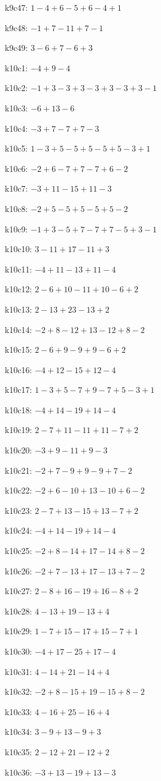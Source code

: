 k9c47: $ 1-4+6-5+6-4+1 $ 

k9c48: $ -1+7-11+7-1 $ 

k9c49: $ 3-6+7-6+3 $ 

k10c1: $ -4+9-4 $ 

k10c2: $ -1+3-3+3-3+3-3+3-1 $ 

k10c3: $ -6+13-6 $ 

k10c4: $ -3+7-7+7-3 $ 

k10c5: $ 1-3+5-5+5-5+5-3+1 $ 

k10c6: $ -2+6-7+7-7+6-2 $ 

k10c7: $ -3+11-15+11-3 $ 

k10c8: $ -2+5-5+5-5+5-2 $ 

k10c9: $ -1+3-5+7-7+7-5+3-1 $ 

k10c10: $ 3-11+17-11+3 $ 

k10c11: $ -4+11-13+11-4 $ 

k10c12: $ 2-6+10-11+10-6+2 $ 

k10c13: $ 2-13+23-13+2 $ 

k10c14: $ -2+8-12+13-12+8-2 $ 

k10c15: $ 2-6+9-9+9-6+2 $ 

k10c16: $ -4+12-15+12-4 $ 

k10c17: $ 1-3+5-7+9-7+5-3+1 $ 

k10c18: $ -4+14-19+14-4 $ 

k10c19: $ 2-7+11-11+11-7+2 $ 

k10c20: $ -3+9-11+9-3 $ 

k10c21: $ -2+7-9+9-9+7-2 $ 

k10c22: $ -2+6-10+13-10+6-2 $ 

k10c23: $ 2-7+13-15+13-7+2 $ 

k10c24: $ -4+14-19+14-4 $ 

k10c25: $ -2+8-14+17-14+8-2 $ 

k10c26: $ -2+7-13+17-13+7-2 $ 

k10c27: $ 2-8+16-19+16-8+2 $ 

k10c28: $ 4-13+19-13+4 $ 

k10c29: $ 1-7+15-17+15-7+1 $ 

k10c30: $ -4+17-25+17-4 $ 

k10c31: $ 4-14+21-14+4 $ 

k10c32: $ -2+8-15+19-15+8-2 $ 

k10c33: $ 4-16+25-16+4 $ 

k10c34: $ 3-9+13-9+3 $ 

k10c35: $ 2-12+21-12+2 $ 

k10c36: $ -3+13-19+13-3 $ 

